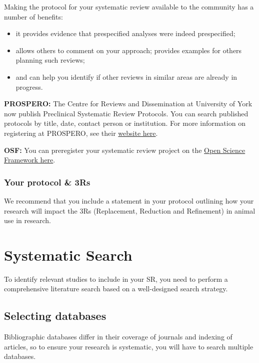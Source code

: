 \documentclass[
]{book}
\providecommand{\tightlist}{%
  \setlength{\itemsep}{0pt}\setlength{\parskip}{0pt}}
\begin{document}
Making the protocol for your systematic review available to the community has a number of benefits:

\begin{itemize}
\tightlist
\item
  it provides evidence that prespecified analyses were indeed prespecified;
\item
  allows others to comment on your approach; provides examples for others planning such reviews;
\item
  and can help you identify if other reviews in similar areas are already in progress.
\end{itemize}

\textbf{PROSPERO:}
The Centre for Reviews and Dissemination at University of York now publish Preclinical Systematic Review Protocols. You can search published protocols by title, date, contact person or institution.
For more information on registering at PROSPERO, see their \href{https://www.crd.york.ac.uk/prospero/}{website here}.

\textbf{OSF:}
You can preregister your systematic review project on the \href{https://osf.io/prereg/}{Open Science Framework here}.

\hypertarget{your-protocol-3rs}{%
\subsection{Your protocol \& 3Rs}\label{your-protocol-3rs}}

We recommend that you include a statement in your protocol outlining how your research will impact the 3Rs (Replacement, Reduction and Refinement) in animal use in research.

\hypertarget{systematic-search}{%
\chapter{Systematic Search}\label{systematic-search}}

To identify relevant studies to include in your SR, you need to perform a comprehensive literature search based on a well-designed search strategy.

\hypertarget{selecting-databases}{%
\section{Selecting databases}\label{selecting-databases}}

Bibliographic databases differ in their coverage of journals and indexing of articles, so to ensure your research is systematic, you will have to search multiple databases.
\end{document}

